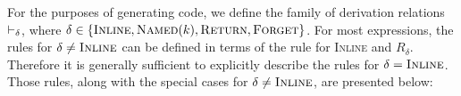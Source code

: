\documentclass{article}
\begin{document}
    For the purposes of generating code, we define the family of derivation relations $\rwD$, where
    $\delta \in \{\textsc{Inline}, \textsc{Named$(k)$}, \textsc{Return}, \textsc{Forget}\}$. For
    most expressions, the rules for $\delta \neq \textsc{Inline}$ can be defined in terms of the
    rule for \textsc{Inline} and $R_{\delta}$. Therefore it is generally sufficient to explicitly
    describe the rules for $\delta = \textsc{Inline}$. Those rules, along with the special cases for
    $\delta \neq \textsc{Inline}$, are presented below:
%
    \begin{mathpar}








\end{mathpar}
\end{document}
